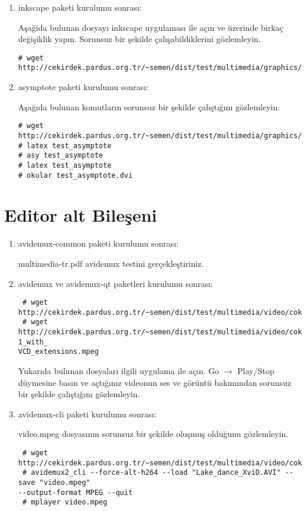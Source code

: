 \documentclass[a4paper,10pt]{article}
\begin{document}
\begin{enumerate}
\item inkscape paketi kurulumu sonrası:

Aşağida bulunan dosyayı inkscape uygulaması ile açın ve üzerinde birkaç değişiklik yapın. Sorunsuz bir şekilde çalışabildiklerini gözlemleyin.
\begin{verbatim}
# wget http://cekirdek.pardus.org.tr/~semen/dist/test/multimedia/graphics/drawing.svg 
\end{verbatim}

\item asymptote paketi kurulumu sonrası:

Aşağıda bulunan komutların sorunsuz bir şekilde çalıştığını gözlemleyin:
\begin{verbatim}
# wget http://cekirdek.pardus.org.tr/~semen/dist/test/multimedia/graphics/test_asymptote.tex
# latex test_asymptote
# asy test_asymptote
# latex test_asymptote
# okular test_asymptote.dvi
\end{verbatim}


\end{enumerate}
\section{Editor alt Bileşeni}
\begin{enumerate}
 \item avidemux-common paketi kurulumu sonrası:

 multimedia-tr.pdf avidemux testini gerçekleştiriniz.

 \item avidemux ve avidemux-qt paketleri kurulumu sonrası:

\begin{verbatim}
 # wget http://cekirdek.pardus.org.tr/~semen/dist/test/multimedia/video/cokluortam/Lake_dance_XviD.AVI
 # wget http://cekirdek.pardus.org.tr/~semen/dist/test/multimedia/video/cokluortam/MPEG-1_with_
VCD_extensions.mpeg
\end{verbatim}
Yukarıda bulunan dosyaları ilgili uygulama ile açın. Go $\rightarrow$ Play/Stop düymesine basın ve açtığınız videonun ses ve görüntü bakımından sorunsuz bir şekilde çalıştığını gözlemleyin.
\item avidemux-cli paketi kurulumu sonrası:

video.mpeg dosyasının sorunsuz bir şekilde oluşmuş olduğunu gözlemleyin.
\begin{verbatim}
 # wget http://cekirdek.pardus.org.tr/~semen/dist/test/multimedia/video/cokluortam/Lake_dance_XviD.AVI
 # avidemux2_cli --force-alt-h264 --load "Lake_dance_XviD.AVI" --save "video.mpeg" 
--output-format MPEG --quit 
 # mplayer video.mpeg
\end{verbatim}

\end{enumerate}
\end{document}
